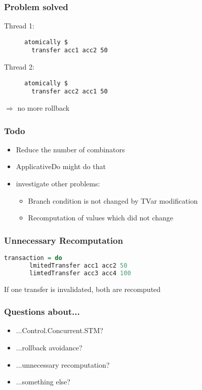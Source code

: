 \documentclass{beamer}
\begin{document}
 
  \begin{frame}[fragile]
    \frametitle{Problem solved}
    \fboxsep=0pt
    \noindent
    \begin{minipage}[t]{0.48\linewidth}
      Thread 1:
      \begin{figure}
       \begin{lstlisting}[frame=single]
atomically $ 
  transfer acc1 acc2 50
       \end{lstlisting}
      \end{figure}
    \end{minipage}%
    \hfill%
    \begin{minipage}[t]{0.48\linewidth}
      Thread 2:
      \begin{figure}
       \begin{lstlisting}[frame=single]
atomically $ 
  transfer acc2 acc1 50
       \end{lstlisting}
      \end{figure}
    \end{minipage}
    \vfill
    $\Rightarrow$ no more rollback
\end{frame}
  
  
  \begin{frame}
   \frametitle{Todo}
   \begin{itemize}\setlength\itemsep{1em}
    \item Reduce the number of combinators
    \item ApplicativeDo might do that
    \item investigate other problems:
      \begin{itemize}
        \item Branch condition is not changed by TVar modification
        \item Recomputation of values which did not change
      \end{itemize}
   \end{itemize}
  \end{frame}

  \begin{frame}[fragile]
    \frametitle{Unnecessary Recomputation}
    \begin{lstlisting}[language=Haskell]
     transaction = do
       lmitedTransfer acc1 acc2 50
       limtedTransfer acc3 acc4 100
    \end{lstlisting}
    \vfill
    If one transfer is invalidated, both are recomputed
\end{frame}


\begin{frame}
 \frametitle{Questions about...}
 \begin{itemize}\setlength\itemsep{1em}
  \item ...Control.Concurrent.STM?
  \item ...rollback avoidance?
  \item ...unnecessary recomputation?
  \item ...something else?
 \end{itemize}

\end{frame}


  
\end{document}
